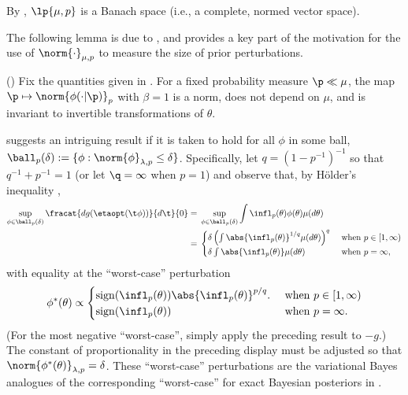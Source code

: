 By \citep[Theorem 5.2.1]{dudley:2018:real}, $\lp{\mu,p}$ is a Banach
space (i.e., a complete, normed vector space).

The following lemma is due to \citep{gustafson:1996:local}, and provides
a key part of the motivation for the use of $\norm{\cdot}_{\mu,p}$ to measure
the size of prior perturbations.

\begin{lem}
%
(\citet{gustafson:1996:local})
%
Fix the quantities given in .  For a fixed probability
measure $\p \ll \mu$, the map $\p \mapsto \norm{\phi(\cdot \vert \p)}_p$ with
$\beta = 1$ is a norm, does not depend on $\mu$, and is invariant to invertible
transformations of $\theta$.
%
%
\end{lem}

 suggests an intriguing result if it is taken to hold
for all $\phi$ in some ball, $\ball_p(\delta) := \{\phi: \norm{\phi}_{\lambda,p}
\le \delta \}$. Specifically, let $q = (1 - p^{-1})^{-1}$ so that $q^{-1} +
p^{-1} = 1$ (or let $\q=\infty$ when $p=1$) and observe that, by H{\"o}lder's
inequality \citep[Theorem 5.1.2 and subsequent disscussion]{dudley:2018:real},
%
\begin{align*}
%
\sup_{\phi \in \ball_p(\delta)} \fracat{d g(\etaopt(\t \phi))}{d \t}{0} ={}&
    \sup_{\phi \in \ball_p(\delta)}
        \int \infl_p(\theta) \phi(\theta) \mu(d\theta)
\\={}&
\begin{cases}
\delta \left( \int \abs{\infl_p(\theta)}^{1/q} \mu(d\theta) \right)^q
    & \textrm{ when }p \in [1, \infty)\\
\delta \int \abs{\infl_p(\theta)} \mu(d\theta)
    & \textrm{ when }p = \infty,
\end{cases}
%
\end{align*}
%
with equality at the ``worst-case'' perturbation
%
\begin{align*}
%
\phi^*(\theta) \propto
\begin{cases}
\mathrm{sign}(\infl_p(\theta)) \abs{\infl_p(\theta)}^{p/q}.
& \textrm{ when }p \in [1, \infty)\\
\mathrm{sign}(\infl_p(\theta))
& \textrm{ when }p = \infty.
\end{cases}
%
\end{align*}
%
(For the most negative ``worst-case'', simply apply the preceding result to
$-g$.) The constant of proportionality in the preceding display must be adjusted
so that $\norm{\phi^*(\theta)}_{\lambda,p} = \delta$.  These ``worst-case''
perturbations are the variational Bayes analogues of the corresponding
``worst-case'' for exact Bayesian posteriors in \citet{gustafson:1996:local}.

